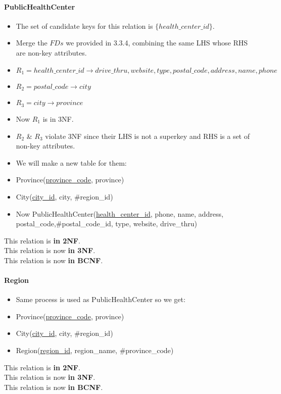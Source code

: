 \paragraph{PublicHealthCenter}
\begin{itemize}
    \item The set of candidate keys for this relation is $\{health\_center\_id\}$.
    \item Merge the $FDs$ we provided in 3.3.4, combining the same LHS whose RHS are non-key attributes.
    \item $R_1 = health\_center\_id \rightarrow drive\_thru, website, type, postal\_code, address, name, phone$
    \item $R_2 = postal\_code \rightarrow city$
    \item $R_3 = city \rightarrow province$
    \item Now $R_1$ is in 3NF.
    \item $R_2$ \& $R_3$ violate 3NF since their LHS is not a superkey and RHS is a set of non-key attributes.
    \item We will make a new table for them:
    \item Province(\underline{province\_code}, province)
    \item City(\underline{city\_id}, city, \#region\_id)
    \item Now PublicHealthCenter(\underline{health\_center\_id}, phone, name, address, postal\_code,\#postal\_code\_id, type, website, drive\_thru)
\end{itemize}
This relation is \textbf{in 2NF}.\\
This relation is now \textbf{in 3NF}.\\
This relation is now \textbf{in BCNF}.
\paragraph{Region} 
\begin{itemize}
    \item Same process is used as PublicHealthCenter so we get:
    \item Province(\underline{province\_code}, province)
    \item City(\underline{city\_id}, city, \#region\_id)
    \item Region(\underline{region\_id}, region\_name, \#province\_code)
    \end{itemize}
This relation is \textbf{in 2NF}.\\
This relation is now \textbf{in 3NF}.\\
This relation is now \textbf{in BCNF}.
